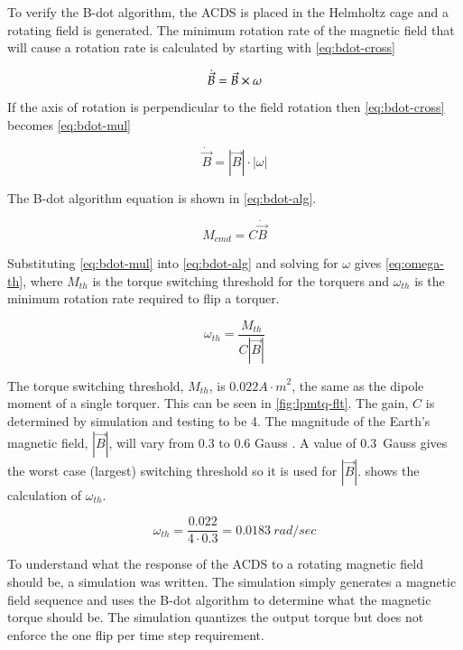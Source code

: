 To verify the B-dot algorithm, the \ac{ACDS} is placed in the Helmholtz cage and a rotating field is generated. The minimum rotation rate of the magnetic field that will cause a rotation rate is calculated by starting with \cref{eq:bdot-cross}

\begin{equation}
    \dot{\vec{B}} = \vec{B} \times \omega
    \label{eq:bdot-cross}
\end{equation}

If the axis of rotation is perpendicular to the field rotation then \cref{eq:bdot-cross} becomes \cref{eq:bdot-mul}

\begin{equation}
    \dot{\vec{B}} = \left| \vec{B} \right| \cdot \left| \omega \right|
    \label{eq:bdot-mul}
\end{equation}

The B-dot algorithm equation is shown in \cref{eq:bdot-alg}.

\begin{equation}
    M_{cmd} = C \dot{\vec{B}} 
    \label{eq:bdot-alg}
\end{equation}

Substituting \cref{eq:bdot-mul} into \cref{eq:bdot-alg} and solving for $\omega$ gives \cref{eq:omega-th}, where $M_{th}$ is the torque switching threshold for the torquers and $\omega_{th}$ is the minimum rotation rate required to flip a torquer.

\begin{equation}
    \omega _ {th} = \frac{M _ {th}}{C \left| \vec{B} \right|}
    \label{eq:omega-th}
\end{equation}

The torque switching threshold, $M_{th}$, is $0.022 \unit{A \cdot m} ^2$, the same as the dipole moment of a single torquer. This can be seen in \cref{fig:lpmtq-flt}. The gain, $C$ is determined by simulation and testing to be 4. The magnitude of the Earth's magnetic field, ${\left| \vec{B} \right|}$, will vary from 0.3 to 0.6 Gauss \cite[pp.~114]{Wertz}. A value of 0.3~Gauss gives the worst case (largest) switching threshold so it is used for ${\left| \vec{B} \right|}$.  shows the calculation of $\omega_{th}$.

\begin{equation}
    \omega _ {th} =  \frac{0.022}{4 \cdot 0.3} = 0.0183 ~ \unit{rad / sec}
    \label{eq:omega-th-calc}
\end{equation}

To understand what the response of the \ac{ACDS} to a rotating magnetic field should be, a simulation was written. The simulation simply generates a magnetic field sequence and uses the B-dot algorithm to determine what the magnetic torque should be. The simulation quantizes the output torque but does not enforce the one flip per time step requirement.

